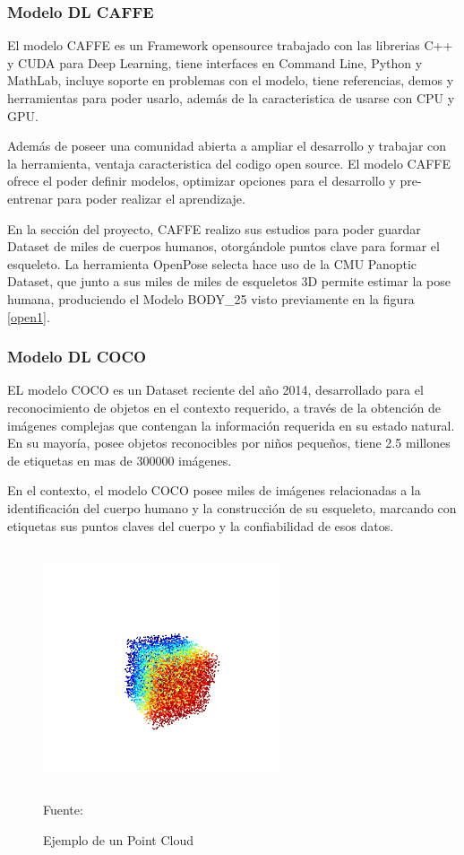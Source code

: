 \subsubsection{Modelo DL CAFFE}

El modelo CAFFE es un Framework opensource trabajado con las librerias C++ y CUDA para Deep Learning, tiene interfaces en Command Line, Python y MathLab, incluye soporte en problemas con el modelo, tiene referencias, demos y herramientas para poder usarlo, además de la caracteristica de usarse con CPU y GPU\cite{jia2014caffe}.

Además de poseer una comunidad abierta a ampliar el desarrollo y trabajar con la herramienta, ventaja caracteristica del codigo open source. 
El modelo CAFFE ofrece el poder definir modelos, optimizar opciones para el desarrollo y pre-entrenar para poder realizar el aprendizaje.

En la sección del proyecto, CAFFE realizo sus estudios para poder guardar Dataset de miles de cuerpos humanos, otorgándole puntos clave para formar el esqueleto. 
La herramienta OpenPose selecta hace uso de la CMU Panoptic Dataset, que junto a  sus miles de miles de esqueletos 3D permite estimar la pose humana, produciendo el Modelo BODY\_25 visto previamente en la figura \ref{open1}.

\subsubsection{Modelo DL COCO}

EL modelo COCO es un Dataset reciente del año 2014, desarrollado para el reconocimiento de objetos en el contexto requerido, a través de la obtención de imágenes complejas que contengan la información requerida en su estado natural.
En su mayoría, posee objetos reconocibles por niños pequeños, tiene 2.5 millones de etiquetas en mas de 300000 imágenes.

En el contexto, el modelo COCO posee miles de imágenes relacionadas a la identificación del cuerpo humano y la construcción de su esqueleto, marcando con etiquetas sus puntos claves del cuerpo y la confiabilidad de esos datos\cite{lin2014microsoft}.

\begin{figure}[t!]
	\centering
	\includegraphics[width=7cm,height=7cm,]{./Images/pointcloudexample.jpg}
	\caption{Ejemplo de un Point Cloud}
	\footnotesize Fuente: \cite{pointcloudexample}
	\label{pointcloudexample}
\end{figure}

